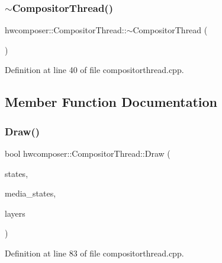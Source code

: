 \subsubsection{\texorpdfstring{$\sim$\+Compositor\+Thread()}{~CompositorThread()}}
{\footnotesize\ttfamily hwcomposer\+::\+Compositor\+Thread\+::$\sim$\+Compositor\+Thread (\begin{DoxyParamCaption}{ }\end{DoxyParamCaption})\hspace{0.3cm}{\ttfamily [override]}}



Definition at line 40 of file compositorthread.\+cpp.


\begin{DoxyCode}{0}
\end{DoxyCode}


\subsection{Member Function Documentation}
\mbox{\label{classhwcomposer_1_1CompositorThread_a16c0227a122423a7f83a8369f600923b}} 
\subsubsection{\texorpdfstring{Draw()}{Draw()}}
{\footnotesize\ttfamily bool hwcomposer\+::\+Compositor\+Thread\+::\+Draw (\begin{DoxyParamCaption}\item[{std\+::vector$<$ \mbox{\hyperlink{structhwcomposer_1_1DrawState}{Draw\+State}} $>$ \&}]{states,  }\item[{std\+::vector$<$ \mbox{\hyperlink{structhwcomposer_1_1DrawState}{Draw\+State}} $>$ \&}]{media\+\_\+states,  }\item[{const std\+::vector$<$ \mbox{\hyperlink{structhwcomposer_1_1OverlayLayer}{Overlay\+Layer}} $>$ \&}]{layers }\end{DoxyParamCaption})}



Definition at line 83 of file compositorthread.\+cpp.


